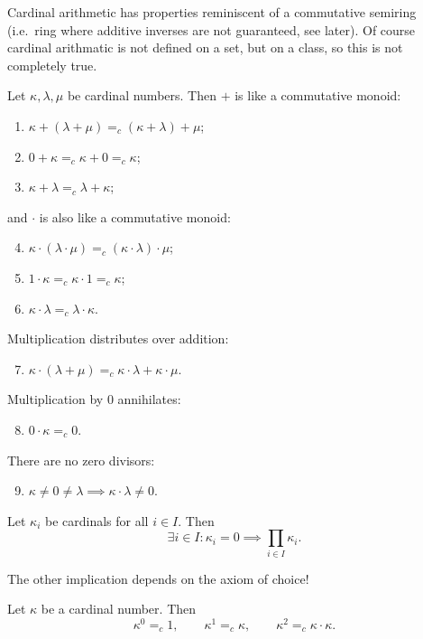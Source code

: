 Cardinal arithmetic has properties reminiscent of a commutative semiring (i.e.\ ring where additive inverses are not guaranteed, see later). Of course cardinal arithmatic is not defined on a set, but on a class, so this is not completely true.
\begin{lemma} \label{cardinalArithmetic}
Let $\kappa,\lambda, \mu$ be cardinal numbers. Then $+$ is like a commutative monoid:
\begin{enumerate}
\item $\kappa + (\lambda+\mu) =_c (\kappa+\lambda)+\mu$;
\item $0+\kappa =_c \kappa+0 =_c \kappa$;
\item $\kappa+\lambda =_c \lambda+\kappa$;
\end{enumerate}
and $\cdot$ is also like a commutative monoid:
\begin{enumerate}
\setcounter{enumi}{3}
\item $\kappa \cdot (\lambda\cdot\mu) =_c (\kappa\cdot\lambda)\cdot\mu$;
\item $1\cdot\kappa =_c \kappa\cdot 1 =_c \kappa$;
\item $\kappa\cdot\lambda =_c \lambda\cdot\kappa$.
\end{enumerate}
Multiplication distributes over addition:
\begin{enumerate}
\setcounter{enumi}{6}
\item $\kappa\cdot(\lambda +\mu) =_c \kappa\cdot \lambda+\kappa\cdot\mu$.
\end{enumerate}
Multiplication by $0$ annihilates:
\begin{enumerate}
\setcounter{enumi}{7}
\item $0\cdot \kappa =_c 0$.
\end{enumerate}
There are no zero divisors:
\begin{enumerate}
\setcounter{enumi}{8}
\item $\kappa\neq 0 \neq \lambda \implies \kappa\cdot\lambda \neq 0$.
\end{enumerate}
\end{lemma}
\begin{lemma}
Let $\kappa_i$ be cardinals for all $i\in I$. Then
\[ \exists i\in I: \kappa_i = 0 \implies \prod_{i\in I}\kappa_i. \]
\end{lemma}
The other implication depends on the axiom of choice!

\begin{lemma}
Let $\kappa$ be a cardinal number. Then
\[ \kappa^0 =_c 1, \qquad \kappa^1 =_c \kappa, \qquad \kappa^2 =_c \kappa\cdot \kappa. \]
\end{lemma}

